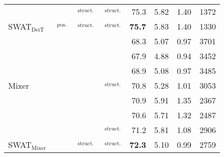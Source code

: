 \documentclass[10pt,twocolumn,letterpaper]{article}
\newcommand{\cmark}{\ding{51}}%
\newcommand{\xmark}{\ding{55}}%
\begin{document}
\begin{table*}[ht]
{{\begin{tabular}{l|l|l|l|r|r|r|r}
				& $\;$\cmark & $\;$\cmark$_\text{struct.}$ & $\;$\cmark$_\text{struct.}$ & 75.3  & 5.82  & 1.40 & 1372 \\ %
				
				\rowcolor{row}SWAT$_\text{DeiT}$ & $\;$\cmark$_\text{pos.}$ & $\;$\cmark$_\text{struct.}$ & $\;$\cmark$_\text{struct.}$ & \textbf{75.7}  & 5.83 & 1.40 & 1330 \\ %
				
				\hline
				\multirow{7}{*}{Mixer \cite{tolstikhin2021mixer}} & $\;$\xmark & $\;$\xmark & $\;$\xmark &  68.3 & 5.07  & 0.97 & 3701\\
				
				& $\;$\cmark & $\;$\xmark & $\;$\xmark & 67.9  & 4.88  & 0.94 & 3452 \\ %
				
				& $\;$\xmark & $\;$\cmark & $\;$\xmark & 68.9  & 5.08  & 0.97 & 3485 \\ %
				
				& $\;$\xmark & $\;$\xmark & $\;$\cmark$_\text{struct.}$ & 70.8 & 5.28  & 1.01 & 3053 \\ %
				
				& $\;$\xmark & $\;$\cmark & $\;$\cmark & 70.9 & 5.91  & 1.35 & 2367 \\ %
				
				& $\;$\cmark & $\;$\cmark & $\;$\cmark & 70.6 & 5.71  & 1.32 & 2487 \\ %
				
				& $\;$\xmark & $\;$\cmark & $\;$\cmark$_\text{struct.}$ & 71.2  & 5.81 & 1.08 & 2906 \\ %
				
				\rowcolor{row}SWAT$_\text{Mixer}$ & $\;$\cmark & $\;$\cmark$_\text{struct.}$ & $\;$\cmark$_\text{struct.}$ & \textbf{72.3} & 5.10 & 0.99 & 2759 \\ %
				

\end{tabular}}}
\end{table*}
\end{document}
